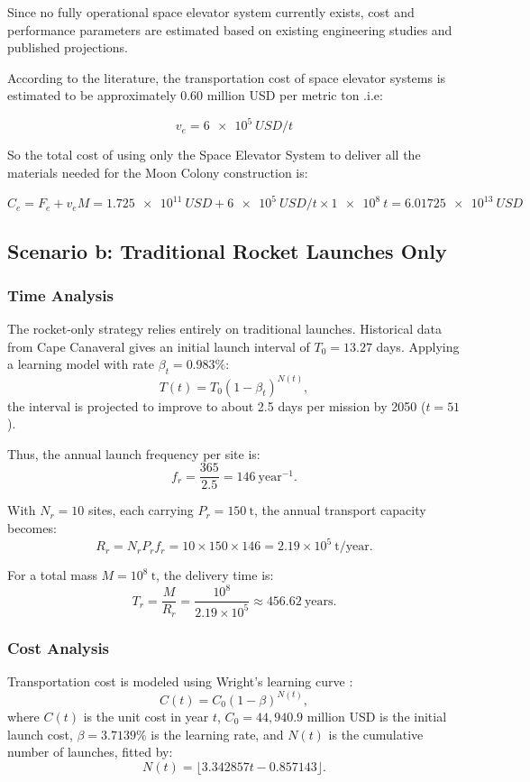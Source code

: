 \documentclass{mcmthesis}
\begin{document}
Since no fully operational space elevator system currently exists, cost and performance parameters are estimated based on existing engineering studies and published projections.

According to the literature, the transportation cost of space elevator systems is estimated to be approximately 0.60 million USD per metric ton \cite{3,7}.i.e:

\[v_e=\SI{6e5}{USD/t}\]

So the total cost of using only the Space Elevator System to deliver all the materials needed for the Moon Colony construction is:

\[C_e=F_e+v_eM=\SI{1.725e11}{USD}+\SI{6e5}{USD/t}\times\SI{1e8}{t}=\SI{6.01725e13}{USD}\]

\subsection{Scenario b: Traditional Rocket Launches Only}

\subsubsection{Time Analysis}
The rocket-only strategy relies entirely on traditional launches. Historical data from Cape Canaveral gives an initial launch interval of \(T_0 = 13.27\) days. Applying a learning model with rate \(\beta_t = 0.983\%\):
\begin{equation}
    T(t) = T_0 (1 - \beta_t)^{N(t)},
\end{equation}
the interval is projected to improve to about 2.5 days per mission by 2050 (\(t = 51\)).

Thus, the annual launch frequency per site is:
\[
f_r = \frac{365}{2.5} = 146\ \mathrm{year^{-1}}.
\]

With \(N_r = 10\) sites, each carrying \(P_r = 150\ \mathrm{t}\), the annual transport capacity becomes:
\[
R_r = N_r P_r f_r = 10 \times 150 \times 146 = 2.19 \times 10^5\ \mathrm{t/year}.
\]

For a total mass \(M = 10^8\ \mathrm{t}\), the delivery time is:
\[
T_r = \frac{M}{R_r} = \frac{10^8}{2.19 \times 10^5} \approx 456.62\ \text{years}.
\]

\subsubsection{Cost Analysis}

Transportation cost is modeled using Wright's learning curve \cite{1,2}:
\begin{equation}
    C(t) = C_0 (1 - \beta)^{N(t)},
\end{equation}
where \(C(t)\) is the unit cost in year \(t\), \(C_0 = 44{,}940.9\) million USD \cite{4} is the initial launch cost, \(\beta = 3.7139\%\) \cite{5,6} is the learning rate, and \(N(t)\) is the cumulative number of launches, fitted by:
\[
N(t) = \lfloor 3.342857t - 0.857143 \rfloor.
\]
\end{document}
